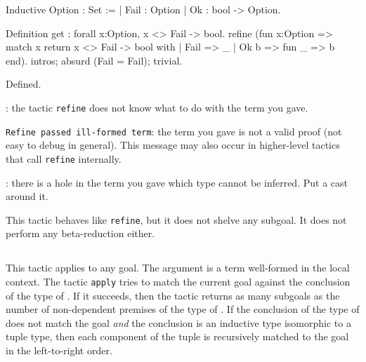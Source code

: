 \Example

\begin{coq_example*}
Inductive Option : Set :=
  | Fail : Option
  | Ok : bool -> Option.
\end{coq_example*}
\begin{coq_example}
Definition get : forall x:Option, x <> Fail -> bool.
refine
 (fun x:Option =>
    match x return x <> Fail -> bool with
    | Fail => _
    | Ok b => fun _ => b
    end).
intros; absurd (Fail = Fail); trivial.
\end{coq_example}
\begin{coq_example*}
Defined.
\end{coq_example*}

\begin{ErrMsgs}
\item {}:
  the tactic \texttt{refine} does not know what to do
  with the term you gave.
\item \texttt{Refine passed ill-formed term}: the term you gave is not
  a valid proof (not easy to debug in general).
  This message may also occur in higher-level tactics that call
  \texttt{refine} internally.
\item {}:
  there is a hole in the term you gave
  which type cannot be inferred. Put a cast around it.
\end{ErrMsgs}

\begin{Variants}
\item {}

  This tactic behaves like {\tt refine}, but it does not shelve any
  subgoal. It does not perform any beta-reduction either.
\end{Variants}

\subsection{}
\label{apply}
\label{eapply}

This tactic applies to any goal.  The argument {\term} is a term
well-formed in the local context.  The tactic {\tt apply} tries to
match the current goal against the conclusion of the type of {\term}.
If it succeeds, then the tactic returns as many subgoals as the number
of non-dependent premises of the type of {\term}. If the conclusion of
the type of {\term} does not match the goal {\em and} the conclusion
is an inductive type isomorphic to a tuple type, then each component
of the tuple is recursively matched to the goal in the left-to-right
order.

